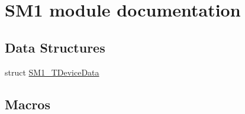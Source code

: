 \hypertarget{group___s_m1__module}{\section{S\-M1 module documentation}
\label{group___s_m1__module}
}
\subsection*{Data Structures}
\begin{DoxyCompactItemize}
\item 
struct \hyperlink{struct_s_m1___t_device_data}{S\-M1\-\_\-\-T\-Device\-Data}
\end{DoxyCompactItemize}
\subsection*{Macros}
